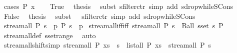 \begin{isabellebody}
\isamarkupfalse%
\ {\isacharparenleft}cases\ {\isachardoublequoteopen}P\ x{\isachardoublequoteclose}{\isacharparenright}\isanewline
\ \ \isamarkupfalse%
\ True\ \isamarkupfalse%
\ {\isacharquery}thesis\ \isamarkupfalse%
\ {\isacharparenleft}subst\ sfilter{\isachardot}ctr{\isacharparenright}\ {\isacharparenleft}simp\ add{\isacharcolon}\ sdrop{\isacharunderscore}while{\isacharunderscore}SCons{\isacharparenright}\isanewline
{}\isamarkupfalse%
\isanewline
\ \ \isamarkupfalse%
\ False\ \isamarkupfalse%
\ {\isacharquery}thesis\ \isamarkupfalse%
\ {\isacharparenleft}subst\ {\isacharparenleft}{}\ {}{\isacharparenright}\ sfilter{\isachardot}ctr{\isacharparenright}\ {\isacharparenleft}simp\ add{\isacharcolon}\ sdrop{\isacharunderscore}while{\isacharunderscore}SCons{\isacharparenright}\isanewline
{}\isamarkupfalse%
%
\endisatagproof
{\isafoldproof}%
%
\isadelimproof
%
\endisadelimproof
%
\isadelimdocument
%
\endisadelimdocument
%
\isatagdocument
%
\isamarkuptrue%
%
\endisatagdocument
{\isafolddocument}%
%
\isadelimdocument
%
\endisadelimdocument
{}\isamarkupfalse%
\ {\isachardoublequoteopen}stream{\isacharunderscore}all\ P\ s\ {\isacharequal}\ {\isacharparenleft}{\isasymforall}p{\isachardot}\ P\ {\isacharparenleft}s\ {\isacharbang}{\isacharbang}\ p{\isacharparenright}{\isacharparenright}{\isachardoublequoteclose}\isanewline
\isanewline
{}\isamarkupfalse%
\ stream{\isacharunderscore}all{\isacharunderscore}iff{\isacharbrackleft}iff{\isacharbrackright}{\isacharcolon}\ {\isachardoublequoteopen}stream{\isacharunderscore}all\ P\ s\ {\isasymlongleftrightarrow}\ Ball\ {\isacharparenleft}sset\ s{\isacharparenright}\ P{\isachardoublequoteclose}\isanewline
%
\isadelimproof
\ \ %
\endisadelimproof
%
\isatagproof
{}\isamarkupfalse%
\ stream{\isacharunderscore}all{\isacharunderscore}def\ sset{\isacharunderscore}range\ \isamarkupfalse%
\ auto%
\endisatagproof
{\isafoldproof}%
%
\isadelimproof
\isanewline
%
\endisadelimproof
\isanewline
{}\isamarkupfalse%
\ stream{\isacharunderscore}all{\isacharunderscore}shift{\isacharbrackleft}simp{\isacharbrackright}{\isacharcolon}\ {\isachardoublequoteopen}stream{\isacharunderscore}all\ P\ {\isacharparenleft}xs\ {\isacharat}{\isacharminus}\ s{\isacharparenright}\ {\isacharequal}\ {\isacharparenleft}list{\isacharunderscore}all\ P\ xs\ {\isasymand}\ stream{\isacharunderscore}all\ P\ s{\isacharparenright}{\isachardoublequoteclose}\isanewline

\end{isabellebody}
